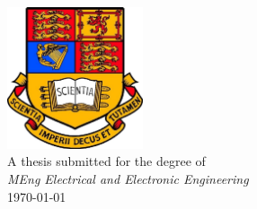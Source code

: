 \begin{titlepage}

\includegraphics[width=4cm]{title/imperialcollegelondon.jpg}\\[1cm] %
 


{\large A thesis submitted for the degree of}\\[0.5cm]
{\large \emph{MEng Electrical and Electronic Engineering}}\\[0.5cm]
{\large \today}\\[2cm] %

\vfill %

\end{titlepage}
